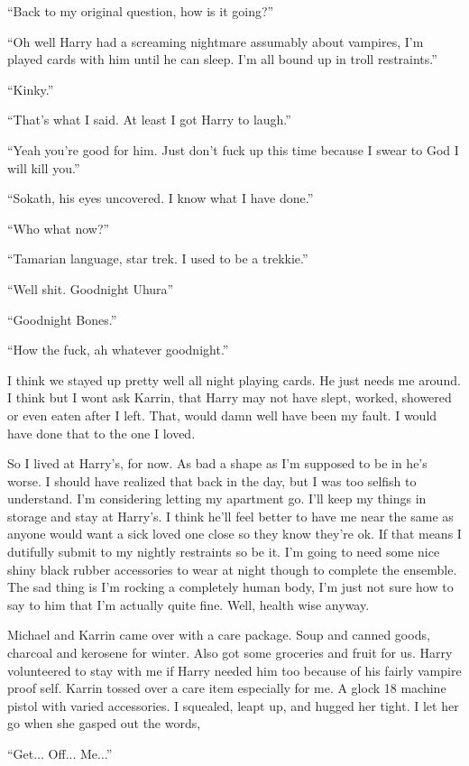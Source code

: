 ``Back to my original question, how is it going?''

``Oh well Harry had a screaming nightmare assumably about vampires, I'm played cards with him until he can sleep. I'm all bound up in troll restraints.''

``Kinky.''

``That's what I said. At least I got Harry to laugh.''

``Yeah you're good for him. Just don't fuck up this time because I swear to God I will kill you.''

``Sokath, his eyes uncovered. I know what I have done.''

``Who what now?''

``Tamarian language, star trek. I used to be a trekkie.''

``Well shit. Goodnight Uhura''

``Goodnight Bones.''

``How the fuck, ah whatever goodnight.''

I think we stayed up pretty well all night playing cards. He just needs me around. I think but I wont ask Karrin, that Harry may not have slept, worked, showered or even eaten after I left. That, would damn well have been my fault. I would have done that to the one I loved.

So I lived at Harry's, for now. As bad a shape as I'm supposed to be in he's worse. I should have realized that back in the day, but I was too selfish to understand. I'm considering letting my apartment go. I'll keep my things in storage and stay at Harry's. I think he'll feel better to have me near the same as anyone would want a sick loved one close so they know they're ok. If that means I dutifully submit to my nightly restraints so be it. I'm going to need some nice shiny black rubber accessories to wear at night though to complete the ensemble. The sad thing is I'm rocking a completely human body, I'm just not sure how to say to him that I'm actually quite fine. Well, health wise anyway.

Michael and Karrin came over with a care package. Soup and canned goods, charcoal and kerosene for winter. Also got some groceries and fruit for us. Harry volunteered to stay with me if Harry needed him too because of his fairly vampire proof self. Karrin tossed over a care item especially for me. A glock 18 machine pistol with varied accessories. I squealed, leapt up, and hugged her tight. I let her go when she gasped out the words, 

``Get... Off... Me...'' 

